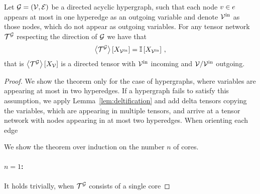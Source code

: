 \begin{theorem}\label{the:conditionalContractionPreservation}
	Let $\mathcal{G}=(\mathcal{V},\mathcal{E})$ be a directed acyclic hypergraph, such that each node $v\in e$ appears at most in one hyperedge as an outgoing variable and denote $\mathcal{V}^{\mathrm{in}}$ as those nodes, which do not appear as outgoing variables.
	For any tensor network $\mathcal{T}^{\mathcal{G}}$ respecting the direction of $\mathcal{G}$ we have that
		\[ \left\langle \mathcal{T}^{\mathcal{G}}\right\rangle \left[ X_{\mathcal{V}^{\mathrm{in}}} \right] = \mathbb{I}\left[X_{\mathcal{V}^{\mathrm{in}}}\right] \, , \]
	that is $\left\langle \mathcal{T}^{\mathcal{G}}\right\rangle \left[ X_{\mathcal{V}} \right]$ is a directed tensor with $\mathcal{V}^{\mathrm{in}}$ incoming and $\mathcal{V}/\mathcal{V}^{\mathrm{in}}$ outgoing.
\end{theorem}
\begin{proof}
	We show the theorem only for the case of hypergraphs, where variables are appearing at most in two hyperedges.
	If a hypergraph fails to satisfy this assumption, we apply Lemma~\ref{lem:deltification} and add delta tensors copying the variables, which are appearing in multiple tensors, and arrive at a tensor network with nodes appearing in at most two hyperedges.
	When orienting each edge 
	
	We show the theorem over induction on the number $n$ of cores.
	\paragraph{$n=1$:} It holds trivially, when $\mathcal{T}^{\mathcal{G}}$ consists of a single core

\end{proof}
